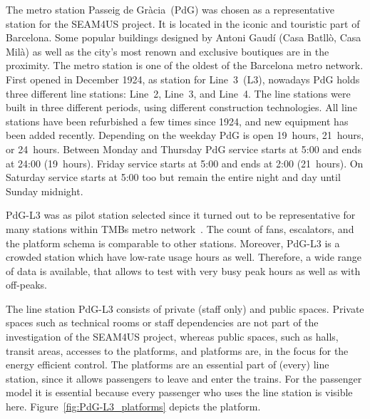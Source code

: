 The metro station Passeig de Gr\`{a}cia~(PdG) was chosen as a representative station for the SEAM4US project.
It is located in the iconic and touristic part of Barcelona. Some popular buildings designed by Antoni Gaud\'{i} (Casa Batll\`{o}, Casa Mil\`{a}) as well as the city's most renown and exclusive boutiques are in the proximity.
The metro station is one of the oldest of the Barcelona metro network. 
First opened in December 1924, as station for Line~3~(L3), nowadays PdG holds three different line stations: Line~2, Line~3, and Line~4. The line stations were built in three different periods, using different construction technologies. 
All line stations have been refurbished a few times since 1924, and new equipment has been added recently.
Depending on the weekday PdG is open 19~hours, 21~hours, or 24~hours. 
Between Monday and Thursday PdG service starts at 5:00 and ends at 24:00 (19~hours). Friday service starts at 5:00 and ends at 2:00 (21~hours). On Saturday service starts at 5:00 too but remain the entire night and day until Sunday midnight.

PdG-L3 was as pilot station selected since it turned out to be representative for many stations within TMBs metro network~\cite{TMB_2014}. 
The count of fans, escalators, and the platform schema is comparable to other stations. 
Moreover, PdG-L3 is a crowded station which have low-rate usage hours as well. 
Therefore, a wide range of data is available, that allows to test with very busy peak hours as well as with off-peaks.


The line station PdG-L3 consists of private (staff only) and public spaces. 
Private spaces such as technical rooms or staff dependencies are not part of the investigation of the SEAM4US project, whereas public spaces, such as halls, transit areas, accesses to the platforms, and platforms are, in the focus for the energy efficient control.
The platforms are an essential part of (every) line station, since it allows passengers to leave and enter the trains. 
For the passenger model it is essential because every passenger who uses the line station is visible here. 
Figure~\ref{fig:PdG-L3_platforms} depicts the platform. 



